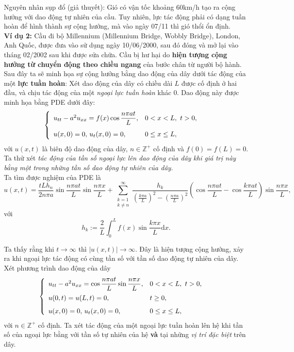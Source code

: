 \documentclass[10pt, a4paper]{article}
\begin{document}
	Nguyên nhân sụp đổ (giả thuyết): Gió có vận tốc khoảng 60km/h tạo ra cộng hưởng với dao động tự nhiên của cầu. Tuy nhiên, lực tác động phải có dạng tuần hoàn để hình thành sự cộng hưởng, mà vào ngày 07/11 thì gió thổi ổn định.\\
	
	\textbf{Ví dụ 2:} Cầu đi bộ Millennium (Millennium Bridge, Wobbly Bridge), London, Anh Quốc, được đưa vào sử dụng ngày 10/06/2000, sau đó đóng và mở lại vào tháng 02/2002 sau khi được sửa chữa. Cầu bị hư hại do \textbf{hiện tượng cộng hưởng từ chuyển động theo chiều ngang} của bước chân từ người bộ hành.\\
	
	Sau đây ta sẽ minh họa sự cộng hưởng bằng dao động của dây dưới tác động của một \textbf{lực tuần hoàn}: Xét dao động của dây có chiều dài $L$ được cố định ở hai đầu, và chịu tác động của một \textit{ngoại lực tuần hoàn} khác 0. Dao động này được minh họa bằng PDE dưới đây: $$\begin{cases}
	\begin{array}{ll}
		u_{tt}-a^2u_{xx}=f(x)\cos\dfrac{n\pi at}{L}, & 0<x<L,~t>0,\\
		\noalign{\vskip7pt}
		u(x,0)=0,\,u_t(x,0)=0, & 0\le x\le L,
	\end{array}
	\end{cases}$$
	với $u(x,t)$ là biên độ dao động của dây, $n\in\mathbb Z^+$ cố định và $f(0)=f(L)=0$. Ta thử xét \textit{tác động của tần số ngoại lực lên dao động của dây khi giá trị này bằng một trong những tần số dao động tự nhiên của dây.}\\
	
	Ta tìm được nghiệm của PDE là $$u(x,t)=\frac{tLh_n}{2n\pi a}\sin\frac{n\pi at}{L}\sin\frac{n\pi x}{L}+\sum_{\substack{k=1\\k\ne n}}^\infty\frac{h_k}{\left(\frac{k\pi a}{L}\right)^2-\left(\frac{n\pi a}{L}\right)^2}\left(\cos\frac{n\pi at}{L}-\cos\frac{k\pi at}{L}\right)\sin\frac{n\pi x}{L},$$
	với $$h_k:=\frac2L\int_0^Lf(x)\sin\frac{k\pi x}{L}\mathrm dx.$$
	
	Ta thấy rằng khi $t\to\infty$ thì $|u(x,t)|\to\infty$. Đây là hiện tượng cộng hưởng, xảy ra khi ngoại lực tác động có cùng tần số với tần số dao động tự nhiên của dây.\\
	
	Xét phương trình dao động của dây $$\begin{cases}
		\begin{array}{ll}
			u_{tt}-a^2u_{xx}=\cos\dfrac{n\pi at}{L}\sin\dfrac{n\pi x}{L}, & 0<x<L,~t>0,\\
			\noalign{\vskip4pt}
			u(0,t)=u(L,t)=0, & t\ge0,\\
			\noalign{\vskip5pt}
			u(x,0)=0,\,u_t(x,0)=0, & 0\le x\le L,
		\end{array}
	\end{cases}$$
	với $n\in\mathbb Z^+$ cố định. Ta xét tác động của một ngoại lực tuần hoàn lên hệ khi tần số của ngoại lực bằng với tần số tự nhiên của hệ \textbf{và} tại những \textit{vị trí đặc biệt} trên dây.\\
	
\end{document}
